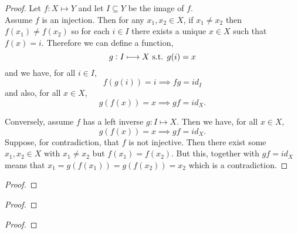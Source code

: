 \documentclass[../MathsNotesBase.tex]{subfiles}
\begin{document}
{		
		\bigskip
		\begin{proof}
			Let ${ f: X \longmapsto Y }$ and let ${ I \subseteq Y }$ be the image of $f$.\\
			
			Assume $f$ is an injection. Then for any ${ x_1, x_2 \in X }$, if ${ x_1 \neq x_2 }$ then ${ f(x_1) \neq f(x_2) }$ so for each ${ i \in I }$ there exists a unique ${ x \in X }$ such that ${ f(x) = i }$. Therefore we can define a function,
			\[ g: I \longmapsto X \text{ s.t. } g(i) = x \]
			and we have, for all ${ i \in I }$,
			\[ f(g(i)) = i \implies fg = id_I \]
			and also, for all ${ x \in X }$,
			\[ g(f(x)) = x \implies gf = id_X. \]
			
			Conversely, assume $f$ has a left inverse ${ g: I \longmapsto X }$. Then we have, for all ${ x \in X }$,
			\[ g(f(x)) = x \implies gf = id_X. \]
			Suppose, for contradiction, that $f$ is not injective. Then there exist some ${ x_1, x_2 \in X }$ with ${ x_1 \neq x_2 }$ but ${ f(x_1) = f(x_2) }$. But this, together with ${ gf = id_X }$ means that ${ x_1 = g(f(x_1)) = g(f(x_2)) = x_2 }$ which is a contradiction.
		\end{proof}
	
		\bigskip
		\begin{proof}
		\end{proof}
		
		\bigskip
		\begin{proof}
		\end{proof}
	
		\medskip
		\begin{proof}
		\end{proof}
		
		
		
		
		
}
\end{document}
